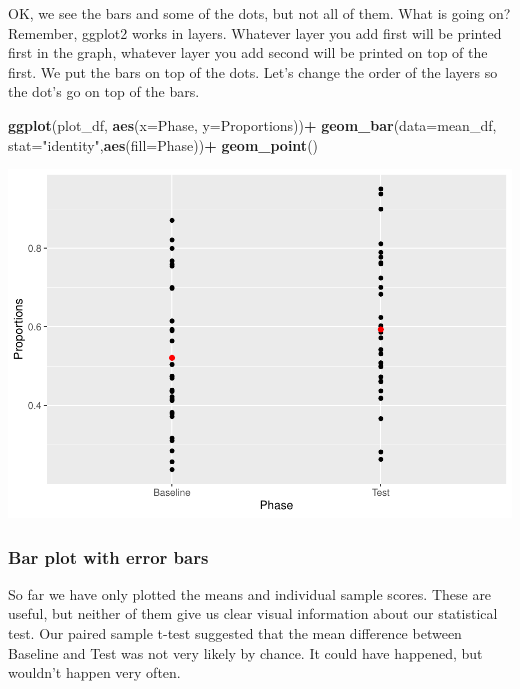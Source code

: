 \documentclass[]{book}
\newenvironment{Shaded}{\begin{snugshade}}{\end{snugshade}}
\newcommand{\KeywordTok}[1]{\textcolor[rgb]{0.13,0.29,0.53}{\textbf{#1}}}
\newcommand{\DataTypeTok}[1]{\textcolor[rgb]{0.13,0.29,0.53}{#1}}
\newcommand{\StringTok}[1]{\textcolor[rgb]{0.31,0.60,0.02}{#1}}
\newcommand{\OperatorTok}[1]{\textcolor[rgb]{0.81,0.36,0.00}{\textbf{#1}}}
\newcommand{\NormalTok}[1]{#1}
\begin{document}
OK, we see the bars and some of the dots, but not all of them. What is
going on? Remember, ggplot2 works in layers. Whatever layer you add
first will be printed first in the graph, whatever layer you add second
will be printed on top of the first. We put the bars on top of the dots.
Let's change the order of the layers so the dot's go on top of the bars.

\begin{Shaded}
\begin{Highlighting}[]
\KeywordTok{ggplot}\NormalTok{(plot_df, }\KeywordTok{aes}\NormalTok{(}\DataTypeTok{x=}\NormalTok{Phase, }\DataTypeTok{y=}\NormalTok{Proportions))}\OperatorTok{+}\StringTok{ }
\StringTok{  }\KeywordTok{geom_bar}\NormalTok{(}\DataTypeTok{data=}\NormalTok{mean_df, }\DataTypeTok{stat=}\StringTok{"identity"}\NormalTok{,}\KeywordTok{aes}\NormalTok{(}\DataTypeTok{fill=}\NormalTok{Phase))}\OperatorTok{+}
\StringTok{  }\KeywordTok{geom_point}\NormalTok{()}
\end{Highlighting}
\end{Shaded}

\includegraphics{Statistics_Lab_files/figure-latex/unnamed-chunk-176-1.pdf}

\subsubsection{Bar plot with error bars}\label{bar-plot-with-error-bars}

So far we have only plotted the means and individual sample scores.
These are useful, but neither of them give us clear visual information
about our statistical test. Our paired sample t-test suggested that the
mean difference between Baseline and Test was not very likely by chance.
It could have happened, but wouldn't happen very often.
\end{document}

